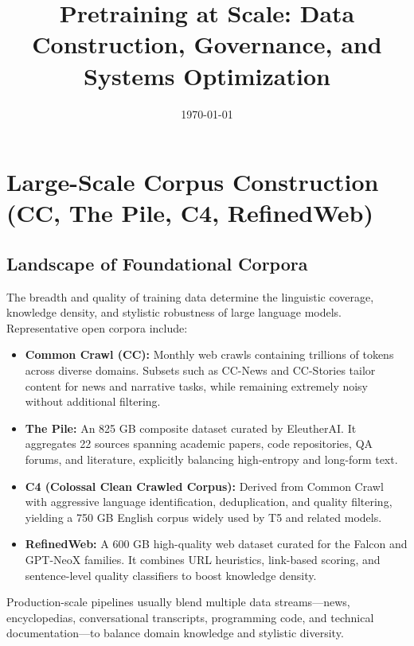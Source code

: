\documentclass{article}
\title{Pretraining at Scale: Data Construction, Governance, and Systems Optimization}
\author{}
\date{\today}
\begin{document}
\maketitle

\section{Large-Scale Corpus Construction (CC, The Pile, C4, RefinedWeb)}
\subsection{Landscape of Foundational Corpora}
The breadth and quality of training data determine the linguistic coverage, knowledge density, and stylistic robustness of large language models. Representative open corpora include:
\begin{itemize}
  \item \textbf{Common Crawl (CC):} Monthly web crawls containing trillions of tokens across diverse domains. Subsets such as CC-News and CC-Stories tailor content for news and narrative tasks, while remaining extremely noisy without additional filtering.
  \item \textbf{The Pile:} An 825 GB composite dataset curated by EleutherAI. It aggregates 22 sources spanning academic papers, code repositories, QA forums, and literature, explicitly balancing high-entropy and long-form text.
  \item \textbf{C4 (Colossal Clean Crawled Corpus):} Derived from Common Crawl with aggressive language identification, deduplication, and quality filtering, yielding a 750 GB English corpus widely used by T5 and related models.
  \item \textbf{RefinedWeb:} A 600 GB high-quality web dataset curated for the Falcon and GPT-NeoX families. It combines URL heuristics, link-based scoring, and sentence-level quality classifiers to boost knowledge density.
\end{itemize}
Production-scale pipelines usually blend multiple data streams—news, encyclopedias, conversational transcripts, programming code, and technical documentation—to balance domain knowledge and stylistic diversity.
\end{document}
